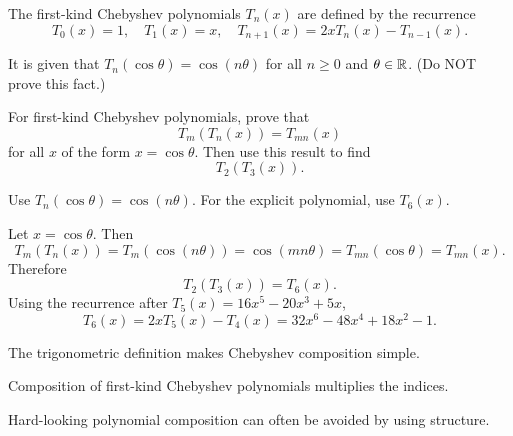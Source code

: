 \begin{problem}

The first-kind Chebyshev polynomials $T_n(x)$ are defined by the recurrence
\[
T_0(x)=1,\quad T_1(x)=x,\quad T_{n+1}(x)=2xT_n(x)-T_{n-1}(x).
\]

It is given that $T_n(\cos\theta)=\cos(n\theta)$ for all $n\ge0$ and $\theta\in\mathbb{R}$. (Do NOT prove this fact.)

For first-kind Chebyshev polynomials, prove that
\[
T_m(T_n(x))=T_{mn}(x)
\]
for all $x$ of the form $x=\cos\theta$. Then use this result to find
\[
T_2(T_3(x)).
\]
\end{problem}
\begin{hint}
Use $T_n(\cos\theta)=\cos(n\theta)$. For the explicit polynomial, use $T_6(x)$.
\end{hint}
\begin{solution}
Let $x=\cos\theta$. Then
\[
T_m(T_n(x))=T_m(\cos(n\theta))=\cos(mn\theta)=T_{mn}(\cos\theta)=T_{mn}(x).
\]
Therefore
\[
T_2(T_3(x))=T_6(x).
\]
Using the recurrence after $T_5(x)=16x^5-20x^3+5x$,
\[
T_6(x)=2xT_5(x)-T_4(x)=32x^6-48x^4+18x^2-1.
\]
\end{solution}
\begin{takeaways}
\item The trigonometric definition makes Chebyshev composition simple.
\item Composition of first-kind Chebyshev polynomials multiplies the indices.
\item Hard-looking polynomial composition can often be avoided by using structure.
\end{takeaways}

